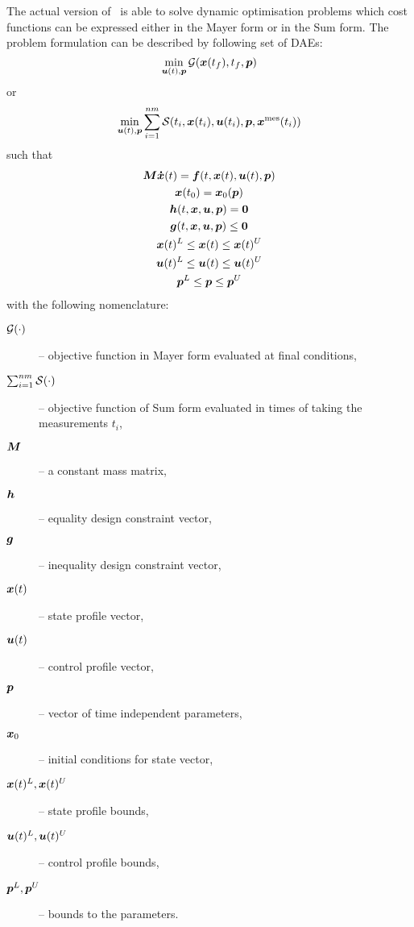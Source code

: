 The actual version of~ is able to solve dynamic
optimisation problems which cost functions can be expressed either in
the Mayer form or in the Sum form. The problem formulation can be
described by following set of DAEs: 
\begin{equation}
\min_{\ve{u}(t),\ve{p}}\mf{G}(\ve{x}(t_{f}),t_{f},\ve{p})
\label{eq:objmajer}  
\end{equation} or
\begin{equation}
\min_{\ve{u}(t),\ve{p}} \sum_{i=1}^{nm} 
\mf{S}(t_{i},\ve{x}(t_{i}),\ve{u}(t_{i}),\ve{p},\ve{x}^{\text{mes}}(t_{i}))
\label{eq:objsum}  
\end{equation} 
such that
\begin{gather*}
\ve{M\dot{x}}(t)=\ve{f}(t,\ve{x}(t),\ve{u}(t),\ve{p})\\ 
\ve{x}(t_{0})=\ve{x}_{0}(\ve{p})\\ 
\ve{h}(t,\ve{x},\ve{u},\ve{p}) = \ve{0}\\
\ve{g}(t,\ve{x},\ve{u},\ve{p}) \leq \ve{0}\\
\ve{x}(t)^{L}\leq \ve{x}(t)\leq \ve{x}(t)^{U}\\ 
\ve{u}(t)^{L}\leq \ve{u}(t)\leq \ve{u}(t)^{U}\\
\ve{p}^{L}\leq \ve{p}\leq \ve{p}^{U}
\end{gather*}with the following nomenclature:
\begin{description}
\item[$\mathcal{G}(\cdot)$] -- objective function in Mayer form evaluated
  at final conditions,  
\item[$\sum_{i=1}^{nm} \mathcal{S}(\cdot)$]  -- objective function of Sum
  form evaluated in times of taking the measurements $t_{i}$, 
\item [$\ve{M}$] -- a constant mass matrix,
\item [$\ve{h}$] -- equality design constraint vector,
\item [$\ve{g}$] -- inequality design constraint vector,
\item [$\ve{x}(t)$] -- state profile vector,
\item [$\ve{u}(t)$] -- control profile vector,
\item [$\ve{p}$] -- vector of time independent parameters,
\item [$\ve{x}_0$] -- initial conditions for state vector,
\item [$\ve{x}(t)^{L},\ve{x}(t)^{U}$] -- state profile bounds, 
\item [$\ve{u}(t)^{L},\ve{u}(t)^{U}$] -- control profile bounds,
\item [$\ve{p}^{L},\ve{p}^{U}$] -- bounds to the parameters.
\end{description} 

